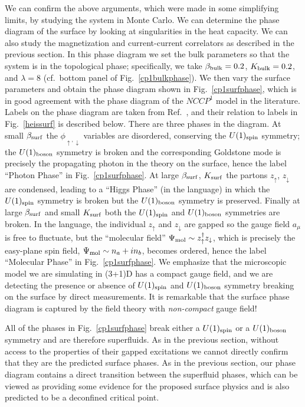 We can confirm the above arguments, which were made in some simplifying limits, by studying the system in Monte Carlo. We can determine the phase diagram of the surface by looking at singularities in the heat capacity. We can also study the magnetization and current-current correlators as described in the previous section. In this phase diagram we set the bulk parameters so that the system is in the topological phase; specifically, we take $\beta_{\rm bulk}=0.2$, $K_{\rm bulk}=0.2$, and $\lambda=8$ (cf.\ bottom panel of Fig.~\ref{cp1bulkphase}). We then vary the surface parameters and obtain the phase diagram shown in Fig.~\ref{cp1surfphase}, which is in good agreement with the phase diagram of the $NCCP^1$ model in the literature. Labels on the phase diagram are taken from Ref.~\cite{LesikAshvin2}, and their relation to labels in Fig.~\ref{heissurf} is described below.
There are three phases in the diagram. At small $\beta_{\rm surf}$ the $\phi_{\uparrow, \downarrow}$ variables are disordered, conserving the $U(1)_{\rm spin}$ symmetry; the $U(1)_{\rm boson}$ symmetry is broken and the corresponding Goldstone mode is precisely the propagating photon in the \nccp theory on the surface, hence the label ``Photon Phase'' in Fig.~\ref{cp1surfphase}. 
At large $\beta_{\rm surf}$, $K_{\rm surf}$ the partons $z_\uparrow$, $z_\downarrow$ are condensed, leading to a ``Higgs Phase'' (in the \nccp language) in which the $U(1)_{\rm spin}$ symmetry is broken but the $U(1)_{\rm boson}$ symmetry is preserved. 
Finally at large $\beta_{\rm surf}$ and small $K_{\rm surf}$ both the $U(1)_{\rm spin}$ and $U(1)_{\rm boson}$ symmetries are broken.  In the \nccp language, the individual $z_\uparrow$ and $z_\downarrow$ are gapped so the gauge field $a_\mu$ is free to fluctuate, but the ``molecular field'' $\Psi_{\rm mol} \sim z_\uparrow^\dagger z_\downarrow$, which is precisely the easy-plane spin field, $\Psi_{\rm mol} \sim n_a + in_b$, becomes ordered, hence the label ``Molecular Phase'' in Fig.~\ref{cp1surfphase}.
We emphasize that the microscopic model we are simulating in (3+1)D has a compact gauge field, and we are detecting the presence or absence of $U(1)_{\rm spin}$ and $U(1)_{\rm boson}$ symmetry breaking on the surface by direct measurements.  It is remarkable that the surface phase diagram is captured by the \nccp field theory with \emph{non-compact} gauge field!

All of the phases in Fig.~\ref{cp1surfphase} break either a $U(1)_{\rm spin}$ or a $U(1)_{\rm boson}$ symmetry and are therefore superfluids. As in the previous section, without access to the properties of their gapped excitations we cannot directly confirm that they are the predicted surface phases. As in the previous section, our phase diagram contains a direct transition between the superfluid phases, which can be viewed as providing some evidence for the proposed surface physics and is also predicted to be a deconfined critical point.\cite{SenthilVishwanath}

